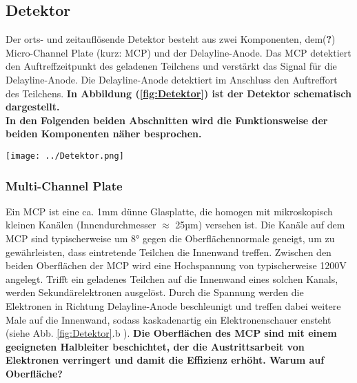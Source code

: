 \subsection{Detektor} \label{sec:Detektor} 

Der orts- und zeitauflösende Detektor besteht aus zwei Komponenten, dem(\textbf{?}) Micro-Channel Plate (kurz: MCP) und der Delayline-Anode. Das MCP detektiert den Auftreffzeitpunkt des geladenen Teilchens und verstärkt das Signal für die Delayline-Anode. Die Delayline-Anode detektiert im Anschluss den Auftreffort des Teilchens. \textbf{In Abbildung (\ref{fig:Detektor}) ist der Detektor schematisch dargestellt.}\\
\textbf{In den Folgenden beiden Abschnitten wird die Funktionsweise der beiden Komponenten näher besprochen.}

\begin{center}
\begin{minipage}{\linewidth}
\centering
\texttt{[image: ../Detektor.png]}%
 \label{fig:Detektor}
\end{minipage} 
\end{center} 

\subsubsection{Multi-Channel Plate}
 Ein MCP ist eine ca. 1mm dünne Glasplatte, die homogen mit mikroskopisch kleinen Kanälen (Innendurchmesser $\approx$ 25µm) versehen ist. Die Kanäle auf dem MCP sind typischerweise um 8° gegen die Oberflächennormale geneigt, um zu gewährleisten, dass eintretende Teilchen die Innenwand treffen. Zwischen den beiden Oberflächen der MCP wird eine Hochspannung von typischerweise 1200V angelegt.
 Trifft ein geladenes Teilchen auf die Innenwand eines solchen Kanals, werden Sekundärelektronen ausgelöst. Durch die Spannung werden die Elektronen in Richtung Delayline-Anode beschleunigt und treffen dabei weitere Male auf die Innenwand, sodass kaskadenartig ein Elektronenschauer ensteht (siehe Abb. \ref{fig:Detektor}.b ). \textbf{Die Oberflächen des MCP sind mit einem geeigneten Halbleiter beschichtet, der die Austrittsarbeit von Elektronen verringert und damit die Effizienz erhöht. Warum auf Oberfläche?}
 
